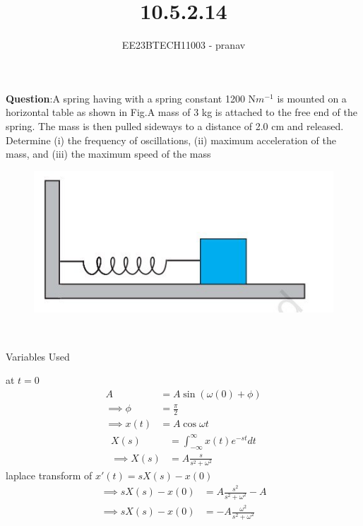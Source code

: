 \documentclass[journal,12pt,twocolumn]{IEEEtran}
\theoremstyle{remark}
\begin{document}

\vspace{3cm}

\title{10.5.2.14}
\author{EE23BTECH11003 - pranav}
\maketitle
\newpage

\bigskip
\renewcommand{\thefigure}{\arabic{figure}}
\renewcommand{\thetable}{\arabic{table}}

\textbf{Question}:A spring having with a spring constant 1200 N$m^{-1}$ is mounted on a horizontal
table as shown in Fig.A mass of 3 kg is attached to the free end of the
spring. The mass is then pulled sideways to a distance of 2.0 cm and released.\\
Determine (i) the frequency of oscillations, (ii) maximum acceleration of the mass,
and (iii) the maximum speed of the mass
\begin{figure}[h!]
    \centering
    \includegraphics[width=0.5\linewidth]{figs/figure.jpg}
    \caption{ }
    
\end{figure}\\
\solution
\begin{table}[h!]
    \centering
    
    \caption{Variables Used}
\end{table}
at $t=0$
\begin{align}
A&=A\sin{(\omega(0)+\phi)}\\
\implies \phi&=\frac{\pi}{2}\\
\implies x(t)&=A\cos{\omega t} 
\end{align}
\begin{align}
X(s)&=\int_{-\infty}^{\infty} x(t)e^{-st}dt \\
\implies X(s)&=A\frac{s}{s^2+\omega^2}
\end{align}
laplace transform of $x'(t)=sX(s)-x(0)$
\begin{align}
 \implies sX(s)-x(0)&=A\frac{s^2}{s^2+\omega^2}-A\\
 \implies sX(s)-x(0)&=-A\frac{\omega^2}{s^2+\omega^2}
\end{align}
\end{document}
